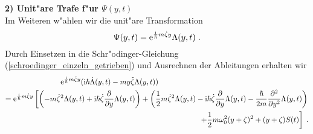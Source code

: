     \textbf{2) Unit"are Trafe f"ur $\Psi(y,t)$}\\
    Im Weiteren w"ahlen wir die unit"are Transformation
    \begin{equation}
      \Psi(y,t) = \text e^{\frac{\text i}{\hbar}m\dot \zeta y}\Lambda(y,t) \; .
    \end{equation}
    Durch Einsetzen in die Schr"odinger-Gleichung (\ref{schroedinger_einzeln_getrieben}) und Ausrechnen der Ableitungen erhalten wir
    \begin{align}
      \begin{split}
        \text e^{\frac{\text i}{\hbar}m\dot \zeta y}(\text i \hbar \dot \Lambda(y,t) - my \ddot{\zeta}\Lambda(y,t))  \quad\quad \quad \quad \quad \quad \quad \quad \quad \quad\quad\quad\quad\quad \quad \quad \quad\quad\quad\quad\\
         = \text e^{\frac{\text i}{\hbar}m\dot \zeta y} \left[\left(-m\dot \zeta^2 \Lambda(y,t) + \text i \hbar \dot \zeta \frac{\partial}{\partial y} \Lambda(y,t) \right) + \left(\frac{1}{2}m\dot \zeta^2 \Lambda(y,t) - \text{i} \hbar \dot \zeta \frac{\partial}{\partial y} \Lambda(y,t) - \frac{\hbar}{2m}\frac{\partial^2}{\partial y^2} \Lambda(y,t)  \right) \right. \\
        \left. + \frac{1}{2}m\omega_0^2(y+\zeta)^2  + (y+\zeta)S(t)  \right] \; .
      \end{split}
    \end{align}
    \iffalse
    Durch Einsetzen in die Schr"odinger-Gleichung und Ausrechnen der Ableitungen erhalten wir f"ur die linke Seite von (\ref{schroedinger_einzeln_getrieben})
    \text e^{\frac{\text i}{\hbar}m\dot \zeta y}(\text i \hbar \dot \Lambda(y,t) - my \ddot{\zeta}\Lambda(y,t))
    \begin{equation}
    \end{equation}
    und f"ur die rechte Seite
    \begin{align}
      \begin{split}
      \text e^{\frac{\text i}{\hbar}m\dot \zeta y} \left[\left(-m\dot \zeta^2 \Lambda(y,t) + \text i \hbar \dot \zeta \frac{\partial}{\partial y} \Lambda(y,t) \right) + \left(\frac{1}{2}m\dot \zeta^2 \Lambda(y,t) - \text{i} \hbar \dot \zeta \frac{\partial}{\partial y} \Lambda(y,t) - \frac{\hbar}{2m}\frac{\partial^2}{\partial y^2} \Lambda(y,t)  \right) \right. \\
      \left. + \left(\frac{1}{2}m\omega_0^2y^2\Lambda(y,t) + m\omega_0^2y\zeta\Lambda(y,t) + \frac{1}{2}m\omega_0^2 \zeta^2\Lambda(y,t)) \right) + \left(-yS(t)\Lambda(y,t) - \zeta S(t)\Lambda(y,t) \right) \right]
    \end{split}
    \end{align}
    \fi

